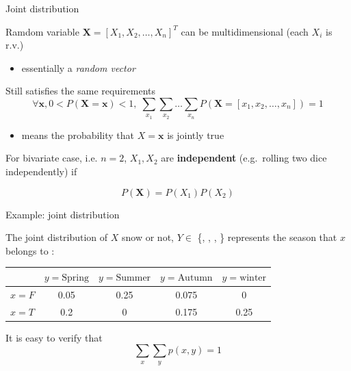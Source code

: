 \documentclass[ignorenonframetext,]{beamer}
\providecommand{\tightlist}{%
  \setlength{\itemsep}{0pt}\setlength{\parskip}{0pt}}
\newcommand{\vv}[1]{\boldsymbol{#1}}
\begin{document}
\begin{frame}{Joint distribution}
\protect\hypertarget{joint-distribution}{}

Ramdom variable \(\vv{X} = [X_1, X_2, \ldots, X_n]^T\) can be
multidimensional (each \(X_i\) is r.v.)

\begin{itemize}
\tightlist
\item
  essentially a \emph{random vector}
\end{itemize}

\bigskip  Still satisfies the same requirements
\[\forall \vv{x}, 0<P(\vv{X}=\vv{x}) <1,\; \sum_{x_1}\sum_{x_2}\ldots\sum_{x_n} P(\vv{X} =[x_1, x_2, \ldots, x_n]) =1\]

\begin{itemize}
\tightlist
\item
  means the probability that \({X} =\vv{x}\) is jointly true
\end{itemize}

\bigskip

For bivariate case, i.e. \(n=2\), \(X_1, X_2\) are \textbf{independent}
(e.g.~rolling two dice independently) if

\[P(\vv{X}) = P(X_1)P(X_2)\]

\end{frame}

\begin{frame}{Example: joint distribution}
\protect\hypertarget{example-joint-distribution}{}

The joint distribution of \(X\) snow or not, \(Y\in\) \{,
, , \} represents the season that
\(x\) belongs to : \bigskip 

\begin{table}\centering
\begin{tabular}{ l | c | c | c | c}
   \centering                    
   & $y=\text{Spring}$ & $y=\text{Summer}$ &$y=\text{Autumn}$ & $y=\text{winter}$\\ 
   \hline
  $x= F$ & 0.05 & 0.25 & 0.075& 0\\
    \hline 
  $x= T$ & 0.2 & 0 & 0.175& 0.25\\ 
\end{tabular}
\end{table}
\bigskip

It is easy to verify that\\
\[\sum_x\sum_y p(x, y) = 1\]

\end{frame}
\end{document}
